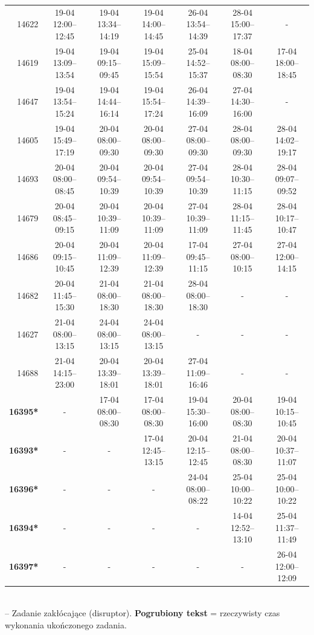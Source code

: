 \begin{table}[htbp]
\begin{tabular}{|r|c|c|c|c|c|c|}
14622 & 19-04 12:00--12:45 & 19-04 13:34--14:19 & 19-04 14:00--14:45 & 26-04 13:54--14:39 & 28-04 15:00--17:37 & - \\ 
14619 & 19-04 13:09--13:54 & 19-04 09:15--09:45 & 19-04 15:09--15:54 & 25-04 14:52--15:37 & 18-04 08:00--08:30 & 17-04 18:00--18:45 \\ 
14647 & 19-04 13:54--15:24 & 19-04 14:44--16:14 & 19-04 15:54--17:24 & 26-04 14:39--16:09 & 27-04 14:30--16:00 & - \\ 
14605 & 19-04 15:49--17:19 & 20-04 08:00--09:30 & 20-04 08:00--09:30 & 27-04 08:00--09:30 & 28-04 08:00--09:30 & 28-04 14:02--19:17 \\ 
14693 & 20-04 08:00--08:45 & 20-04 09:54--10:39 & 20-04 09:54--10:39 & 27-04 09:54--10:39 & 28-04 10:30--11:15 & 28-04 09:07--09:52 \\ 
14679 & 20-04 08:45--09:15 & 20-04 10:39--11:09 & 20-04 10:39--11:09 & 27-04 10:39--11:09 & 28-04 11:15--11:45 & 28-04 10:17--10:47 \\ 
14686 & 20-04 09:15--10:45 & 20-04 11:09--12:39 & 20-04 11:09--12:39 & 17-04 09:45--11:15 & 27-04 08:00--10:15 & 27-04 12:00--14:15 \\ 
14682 & 20-04 11:45--15:30 & 21-04 08:00--18:30 & 21-04 08:00--18:30 & 28-04 08:00--18:30 & - & - \\ 
14627 & 21-04 08:00--13:15 & 24-04 08:00--13:15 & 24-04 08:00--13:15 & - & - & - \\ 
14688 & 21-04 14:15--23:00 & 20-04 13:39--18:01 & 20-04 13:39--18:01 & 27-04 11:09--16:46 & - & - \\ 
\hline
\textbf{16395*} & - & 17-04 08:00--08:30 & 17-04 08:00--08:30 & 19-04 15:30--16:00 & 20-04 08:00--08:30 & 19-04 10:15--10:45 \\ 
\textbf{16393*} & - & - & 17-04 12:45--13:15 & 20-04 12:15--12:45 & 21-04 08:00--08:30 & 20-04 10:37--11:07 \\ 
\textbf{16396*} & - & - & - & 24-04 08:00--08:22 & 25-04 10:00--10:22 & 25-04 10:00--10:22 \\ 
\textbf{16394*} & - & - & - & - & 14-04 12:52--13:10 & 25-04 11:37--11:49 \\ 
\textbf{16397*} & - & - & - & - & - & 26-04 12:00--12:09 \\ 
\hline
\end{tabular}
\\ {\tiny * -- Zadanie zakłócające (disruptor). \textbf{Pogrubiony tekst} = rzeczywisty czas wykonania ukończonego zadania.}
\end{table}

